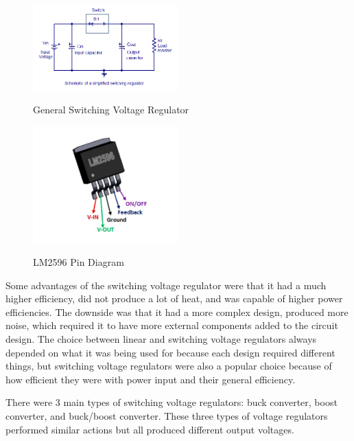 \begin{figure}[H]
    \caption{General Switching Voltage Regulator}
    \centering
    \includegraphics[width=0.5\textwidth]{images/Gen_Switching_Voltage_Regulator.png}
    \label{fig:general-switching-voltage-regulator}
\end{figure}
\begin{figure}[H]
    \caption{LM2596 Pin Diagram}
    \centering
    \includegraphics[width=0.5\textwidth]{images/LM2596_pin_diagram.png}
    \label{fig:lm2596-pin-diagram}
\end{figure}
Some advantages of the switching voltage regulator were that it had a much higher efficiency, did not produce a lot of heat, and was capable of higher power efficiencies. The downside was that it had a more complex design, produced more noise, which required it to have more external components added to the circuit design. The choice between linear and switching voltage regulators always depended on what it was being used for because each design required different things, but switching voltage regulators were also a popular choice because of how efficient they were with power input and their general efficiency.

There were 3 main types of switching voltage regulators: buck converter, boost converter, and buck/boost converter. These three types of voltage regulators performed similar actions but all produced different output voltages.

